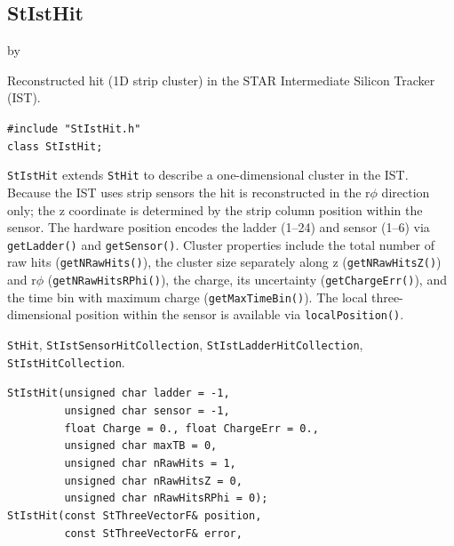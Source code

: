 \documentclass[twoside]{article}
\newcommand{\entrylabel}[1]{\mbox{\textbf{{#1}}}\hfil}%
\newenvironment{entry}
{\begin{list}{}%
    {\renewcommand{\makelabel}{\entrylabel}%
     \setlength{\labelwidth}{90pt}%
     \setlength{\leftmargin}{\labelwidth}
     \advance\leftmargin by \labelsep%
      }%
    }%
  {\end{list}}
\newcommand{\Entrylabel}[1]%
{\raisebox{0pt}[1ex][0pt]{\makebox[\labelwidth][l]%
    {\parbox[t]{\labelwidth}{\hspace{0pt}\textbf{{#1}}}}}}
\newenvironment{Entry}%
{\renewcommand{\entrylabel}{\Entrylabel}\begin{entry}}%
  {\end{entry}}
\begin{document}
\subsection{StIstHit}
\label{sec:StIstHit}
\begin{Entry}
\item[Summary] Reconstructed hit (1D strip cluster) in the STAR Intermediate
    Silicon Tracker (IST).
\item[Synopsis]
    \verb+#include "StIstHit.h"+\\
    \verb+class StIstHit;+\\
\item[Description]
    \texttt{StIstHit} extends \texttt{StHit} to describe a one-dimensional
    cluster in the IST.  Because the IST uses strip sensors the hit is
    reconstructed in the r$\phi$ direction only; the z coordinate is
    determined by the strip column position within the sensor.  The hardware
    position encodes the ladder (1--24) and sensor (1--6) via
    \verb+getLadder()+ and \verb+getSensor()+.  Cluster properties include
    the total number of raw hits (\verb+getNRawHits()+), the cluster size
    separately along z (\verb+getNRawHitsZ()+) and r$\phi$
    (\verb+getNRawHitsRPhi()+), the charge, its uncertainty
    (\verb+getChargeErr()+), and the time bin with maximum charge
    (\verb+getMaxTimeBin()+).  The local three-dimensional position within
    the sensor is available via \verb+localPosition()+.
\item[Related Classes]
    \texttt{StHit}, \texttt{StIstSensorHitCollection},
    \texttt{StIstLadderHitCollection}, \texttt{StIstHitCollection}.
\item[Public\\ Constructors]
    \verb+StIstHit(unsigned char ladder = -1,+\\
    \verb+         unsigned char sensor = -1,+\\
    \verb+         float Charge = 0., float ChargeErr = 0.,+\\
    \verb+         unsigned char maxTB = 0,+\\
    \verb+         unsigned char nRawHits = 1,+\\
    \verb+         unsigned char nRawHitsZ = 0,+\\
    \verb+         unsigned char nRawHitsRPhi = 0);+\\
    \verb+StIstHit(const StThreeVectorF& position,+\\
    \verb+         const StThreeVectorF& error,+\\

\end{Entry}
\end{document}
